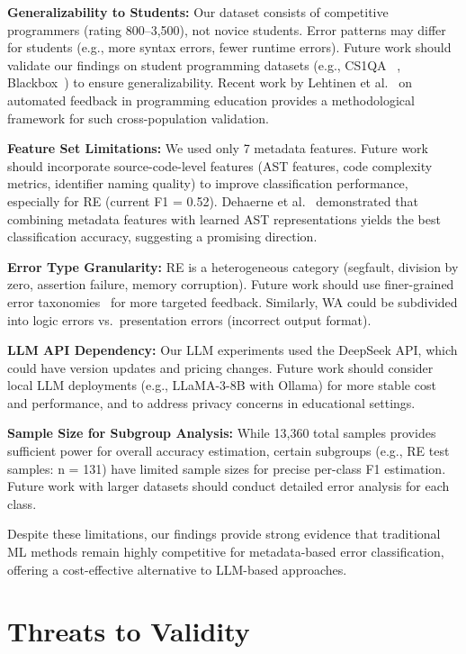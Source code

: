 \documentclass[10pt,a4paper]{article}
\begin{document}
\textbf{Generalizability to Students:} Our dataset consists of competitive
programmers (rating 800--3,500), not novice students. Error patterns may
differ for students (e.g., more syntax errors, fewer runtime errors). Future
work should validate our findings on student programming datasets (e.g., CS1QA
~\cite{lee2022cs1qa}, Blackbox~\cite{bey2022analyzing}) to ensure
generalizability. Recent work by Lehtinen et
al.~\cite{lehtinen2025automated} on automated feedback in programming
education provides a methodological framework for such cross-population
validation.

\textbf{Feature Set Limitations:} We used only 7 metadata features. Future
work should incorporate source-code-level features (AST features, code
complexity metrics, identifier naming quality) to improve classification
performance, especially for RE (current F1 = 0.52). Dehaerne et
al.~\cite{dehaerne2025learned} demonstrated that combining metadata features
with learned AST representations yields the best classification accuracy,
suggesting a promising direction.

\textbf{Error Type Granularity:} RE is a heterogeneous category (segfault,
division by zero, assertion failure, memory corruption). Future work should
use finer-grained error taxonomies~\cite{altadmri2015most} for more targeted
feedback. Similarly, WA could be subdivided into logic errors vs.\ presentation
errors (incorrect output format).

\textbf{LLM API Dependency:} Our LLM experiments used the DeepSeek API, which
could have version updates and pricing changes. Future work should consider
local LLM deployments (e.g., LLaMA-3-8B with Ollama) for more stable cost and
performance, and to address privacy concerns in educational settings.

\textbf{Sample Size for Subgroup Analysis:} While 13,360 total samples provides
sufficient power for overall accuracy estimation, certain subgroups (e.g., RE
test samples: n = 131) have limited sample sizes for precise per-class F1
estimation. Future work with larger datasets should conduct detailed error
analysis for each class.

Despite these limitations, our findings provide strong evidence that
traditional ML methods remain highly competitive for metadata-based error
classification, offering a cost-effective alternative to LLM-based approaches.

\section{Threats to Validity}
\end{document}
